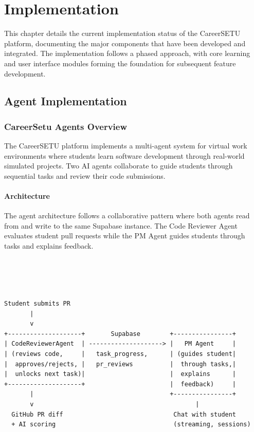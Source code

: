 \documentclass[12pt,a4paper]{report}
\begin{document}
\chapter{Implementation}

This chapter details the current implementation status of the CareerSETU platform, documenting the major components that have been developed and integrated. The implementation follows a phased approach, with core learning and user interface modules forming the foundation for subsequent feature development.

\section{Agent Implementation}

\subsection{CareerSetu Agents Overview}

The CareerSETU platform implements a multi-agent system for virtual work environments where students learn software development through real-world simulated projects. Two AI agents collaborate to guide students through sequential tasks and review their code submissions.


\subsubsection{Architecture}

The agent architecture follows a collaborative pattern where both agents read from and write to the same Supabase instance. The Code Reviewer Agent evaluates student pull requests while the PM Agent guides students through tasks and explains feedback.

\begin{verbatim}




Student submits PR
       |
       v
+--------------------+       Supabase        +----------------+
| CodeReviewerAgent  | --------------------> |   PM Agent     |
| (reviews code,     |   task_progress,      | (guides student|
|  approves/rejects, |   pr_reviews          |  through tasks,|
|  unlocks next task)|                       |  explains      |
+--------------------+                       |  feedback)     |
       |                                     +----------------+
       v                                            |
  GitHub PR diff                              Chat with student
  + AI scoring                                (streaming, sessions)
\end{verbatim}
\end{document}
